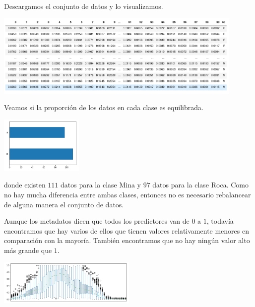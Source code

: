 \documentclass[letterpaper,11pt]{article}
\begin{document}
\begin{enumerate}
    Descargamos el conjunto de datos y lo visualizamos.
    \begin{center}
        \includegraphics[width=0.9\textwidth]{imagenes/sonar-dataset.png}
    \end{center}

    \newpage
    Veamos si la proporción de los datos en cada clase es equilibrada.
    \begin{center}
        \includegraphics[width=0.3\textwidth]{imagenes/sonar-equilibrio.png}
    \end{center}

    donde existen $111$ datos para la clase Mina y $97$ datos para la clase 
    Roca. Como no hay mucha diferencia entre ambas clases, entonces no es 
    necesario rebalancear de alguna manera el conjunto de datos. 

    Aunque los metadatos dicen que todos los predictores van de $0$ a $1$, 
    todavía encontramos que hay varios de ellos que tienen valores relativamente
    menores en comparación con la mayoría. También encontramos que no hay
    ningún valor alto más grande que $1$.
    \begin{center}
        \includegraphics[width=0.5\textwidth]{imagenes/sonar-boxes.png}
    \end{center}


\end{enumerate}
\end{document}
